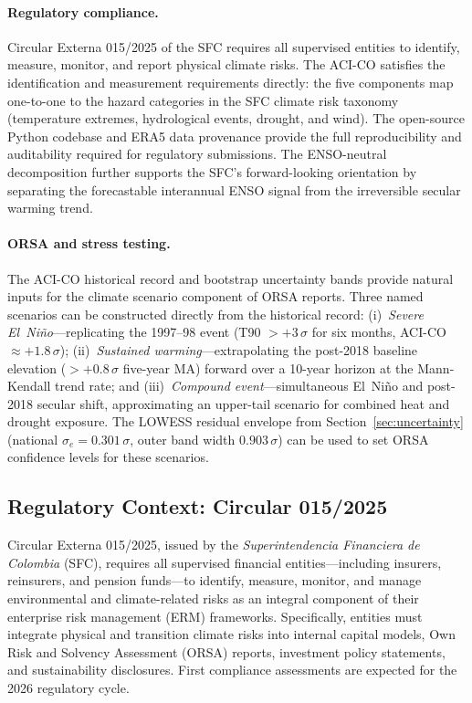 \documentclass[12pt]{article}
\begin{document}
\paragraph{Regulatory compliance.} Circular Externa 015/2025 of the SFC requires all supervised entities to identify, measure, monitor, and report physical climate risks. The ACI-CO satisfies the identification and measurement requirements directly: the five components map one-to-one to the hazard categories in the SFC climate risk taxonomy (temperature extremes, hydrological events, drought, and wind). The open-source Python codebase and ERA5 data provenance provide the full reproducibility and auditability required for regulatory submissions. The ENSO-neutral decomposition further supports the SFC's forward-looking orientation by separating the forecastable interannual ENSO signal from the irreversible secular warming trend.

\paragraph{ORSA and stress testing.} The ACI-CO historical record and bootstrap uncertainty bands provide natural inputs for the climate scenario component of ORSA reports. Three named scenarios can be constructed directly from the historical record: (i)~\emph{Severe El~Ni\~no}---replicating the 1997--98 event (T90 $>+3\,\sigma$ for six months, ACI-CO $\approx +1.8\,\sigma$); (ii)~\emph{Sustained warming}---extrapolating the post-2018 baseline elevation ($>+0.8\,\sigma$ five-year MA) forward over a 10-year horizon at the Mann-Kendall trend rate; and (iii)~\emph{Compound event}---simultaneous El~Ni\~no and post-2018 secular shift, approximating an upper-tail scenario for combined heat and drought exposure. The LOWESS residual envelope from Section~\ref{sec:uncertainty} (national $\sigma_e = 0.301\,\sigma$, outer band width $0.903\,\sigma$) can be used to set ORSA confidence levels for these scenarios.
 
\subsection{Regulatory Context: Circular 015/2025}
 
Circular Externa 015/2025, issued by the \emph{Superintendencia Financiera de
Colombia} (SFC), requires all supervised financial entities---including insurers,
reinsurers, and pension funds---to identify, measure, monitor, and manage
environmental and climate-related risks as an integral component of their
enterprise risk management (ERM) frameworks. Specifically, entities must
integrate physical and transition climate risks into internal capital models,
Own Risk and Solvency Assessment (ORSA) reports, investment policy statements,
and sustainability disclosures. First compliance assessments are expected for
the 2026 regulatory cycle.
\end{document}
